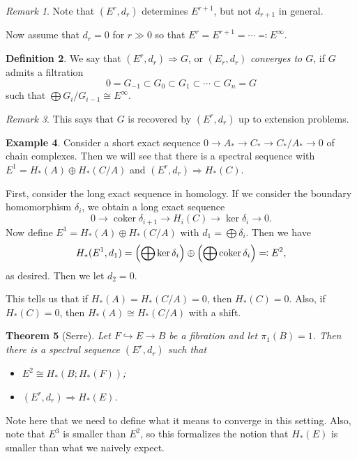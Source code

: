 \documentclass[leqno, openany]{memoir}
\newtheorem{thm}{Theorem}[section]
\theoremstyle{definition}
\newtheorem{defn}[thm]{Definition}
\newtheorem{exm}[thm]{Example}
\theoremstyle{remark}
\newtheorem{rmk}[thm]{Remark}
\theoremstyle{plain}
\theoremstyle{definition}
\theoremstyle{remark}
\begin{document}
\begin{rmk} Note that $(E^r, d_r)$ determines $E^{r+1}$, but not $d_{r+1}$ in
general.  \end{rmk}

Now assume that $d_r = 0$ for $r \gg 0$ so that $E^r = E^{r+1} = \cdots
\eqqcolon E^{\infty}$.

\begin{defn} We say that $(E^r, d_r) \Rightarrow G$, or $(E_r, d_r)$
    \textit{converges to $G$}, if $G$ admits a filtration \[ 0 = G_{-1} \subset
    G_0 \subset G_1 \subset \cdots \subset G_n = G \] such that $\bigoplus G_i
    / G_{i-1} \cong E^{\infty}$.  \end{defn}

\begin{rmk} This says that $G$ is recovered by $(E^r, d_r)$ up to extension
problems.  \end{rmk}

\begin{exm} Consider a short exact sequence $0 \to A_* \to C_* \to C_*/A_* \to
    0$ of chain complexes. Then we will see that there is a spectral sequence
    with $E^1 = H_*(A) \oplus H_*(C/A)$ and $(E^r, d_r) \Rightarrow H_*(C)$. 

    First, consider the long exact sequence in homology. If we consider the
    boundary homomorphism $\delta_i$, we obtain a long exact sequence \[ 0 \to
    \operatorname{coker} \delta_{i+1} \to H_i(C) \to \ker \delta_i \to 0. \]
    Now define $E^1 = H_*(A) \oplus H_*(C / A)$ with $d_1 = \bigoplus
    \delta_i$. Then we have \[ H_*(E^1, d_1) = \qty( \bigoplus \ker \delta_i )
    \oplus \qty(\bigoplus \operatorname{coker} \delta_i) \eqqcolon E^2, \] as
desired. Then we let $d_2 = 0$.  \end{exm}

This tells us that if $H_*(A) = H_*(C/A) = 0$, then $H_*(C) = 0$. Also, if
$H_*(C) = 0$, then $H_*(A) \cong H_*(C/A)$ with a shift.

\begin{thm}[Serre] Let $F \hookrightarrow E \to B$ be a fibration and let
$\pi_1(B) = 1$. Then there is a spectral sequence $(E^r, d_r)$ such that
\begin{itemize} \item $E^2 \cong H_*(B; H_*(F))$; \item $(E^r, d_r) \Rightarrow
H_*(E)$.  \end{itemize} \end{thm}

Note here that we need to define what it means to converge in this setting.
Also, note that $E^3$ is smaller than $E^2$, so this formalizes the notion that
$H_*(E)$ is smaller than what we naively expect.
\end{document}
